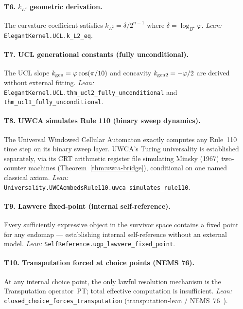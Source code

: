 \documentclass[12pt]{article}
\numberwithin{equation}{section}
\begin{document}
\paragraph{T6. $k_{L^2}$ geometric derivation.}
The curvature coefficient satisfies $k_{L^2} = \delta/2^{n-1}$ where $\delta=\log_{B^\star}\varphi$.
\textit{Lean:} \texttt{ElegantKernel.UCL.k\_L2\_eq}.

\paragraph{T7. UCL generational constants (fully unconditional).}
The UCL slope $k_{\rm gen}=\varphi\cos(\pi/10)$ and concavity $k_{\rm gen2}=-\varphi/2$ are derived without external fitting.
\textit{Lean:} \texttt{ElegantKernel.UCL.thm\_ucl2\_fully\_unconditional} and \texttt{thm\_ucl1\_fully\_unconditional}.

\paragraph{T8. UWCA simulates Rule 110 (binary sweep dynamics).}
The Universal Windowed Cellular Automaton exactly computes any Rule~110 time step on its binary sweep layer. UWCA's Turing universality is established separately, via its CRT arithmetic register file simulating Minsky (1967) two-counter machines (Theorem~\ref{thm:uwca-bridge}), conditional on one named classical axiom.
\textit{Lean:} \texttt{Universality.UWCAembedsRule110.uwca\_simulates\_rule110}.

\paragraph{T9. Lawvere fixed-point (internal self-reference).}
Every sufficiently expressive object in the survivor space contains a fixed point for any endomap — establishing internal self-reference without an external model.
\textit{Lean:} \texttt{SelfReference.ugp\_lawvere\_fixed\_point}.

\paragraph{T10. Transputation forced at choice points (NEMS 76).}
At any internal choice point, the only lawful resolution mechanism is the Transputation operator~PT; total effective computation is insufficient.
\textit{Lean:} \texttt{closed\_choice\_forces\_transputation} (transputation-lean / NEMS~76~\cite{SpivackNEMS76}).
\end{document}
